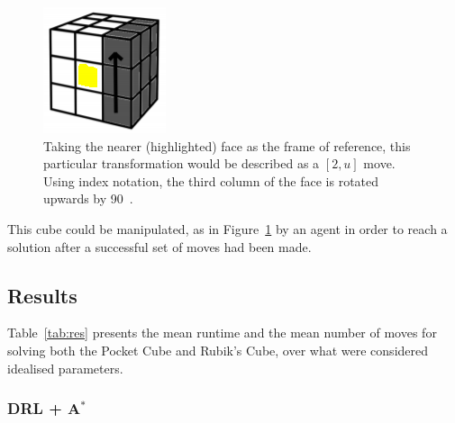 \documentclass[UKenglish]{svproc}
\begin{document}
\begin{figure}[!h]
\begin{small}
\centering
\linespread{1.0}
\includegraphics[width=0.2\linewidth]{images/move_3u}
\caption{Taking the nearer (highlighted) face as the frame of reference, this particular transformation would be described as a $[2,u]$ move. Using index notation, the third column of the face is rotated upwards by 90\textdegree~\cite{proj_l.hoang}.}
\label{fig:fig2}
\end{small}
\end{figure}

This cube could be manipulated, as in Figure~\ref{fig:fig2} by an agent in order to reach a solution after a successful set of moves had been made.

\subsection{Results}

Table~\ref{tab:res} presents the mean runtime and the mean number of moves for solving both the Pocket Cube and Rubik's Cube, over what were considered idealised parameters.



\subsubsection{DRL + A$^{\ast}$}
\end{document}
